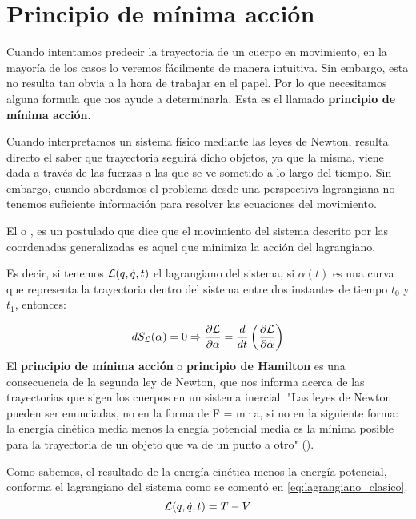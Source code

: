 \section{Principio de mínima acción}\label{sec:principio-de-minima-accion}

Cuando intentamos predecir la trayectoria de un cuerpo en movimiento, en la mayoría de los casos lo veremos fácilmente de manera intuitiva. Sin embargo, esta no resulta tan obvia a la hora de trabajar en el papel. Por lo que necesitamos alguna formula que nos ayude a determinarla. Esta es el llamado \textbf{principio de mínima acción}.

Cuando interpretamos un sistema físico mediante las leyes de Newton, resulta directo el saber que trayectoria seguirá dicho objetos, ya que la misma, viene dada a través de las fuerzas a las que se ve sometido a lo largo del tiempo.
Sin embargo, cuando abordamos el problema desde una perspectiva lagrangiana no tenemos suficiente información para resolver las ecuaciones del movimiento.

El  o , es un postulado que dice que el movimiento del sistema descrito por las coordenadas generalizadas es aquel que minimiza la acción del lagrangiano.

Es decir, si tenemos $\mathcal{L}(q,\dot{q}, t)$ el lagrangiano del sistema, si $\alpha(t)$ es una curva que representa la trayectoria dentro del sistema entre dos instantes de tiempo $t_0$ y $t_1$, entonces:

\begin{equation*}
	dS_{\mathcal{L}}(\alpha)=0\Rightarrow \frac{\partial \mathcal{L}}{\partial \alpha}=\frac{d}{dt}\left( \frac{\partial \mathcal{L}}{\partial \dot{\alpha}} \right)
\end{equation*}
El \textbf{principio de mínima acción} o \textbf{principio de Hamilton} es una consecuencia de la segunda ley de Newton, que nos informa acerca de las trayectorias que sigen los cuerpos en un sistema inercial:
"Las leyes de Newton pueden ser enunciadas, no en la forma de F = m·a, si no en la siguiente forma: la energía cinética media menos la enegía potencial media es la mínima posible para la trayectoria de un objeto que va de un punto a otro"  (\cite{Feynman}).

Como sabemos, el resultado de la energía cinética menos la energía potencial, conforma el lagrangiano del sistema como se comentó en \eqref{eq:lagrangiano_clasico}.
\begin{equation}
	\label{eq:lagrangiano_clasico_corto}
	\mathcal{L}(q,\dot{q},t)=T-V
\end{equation}

